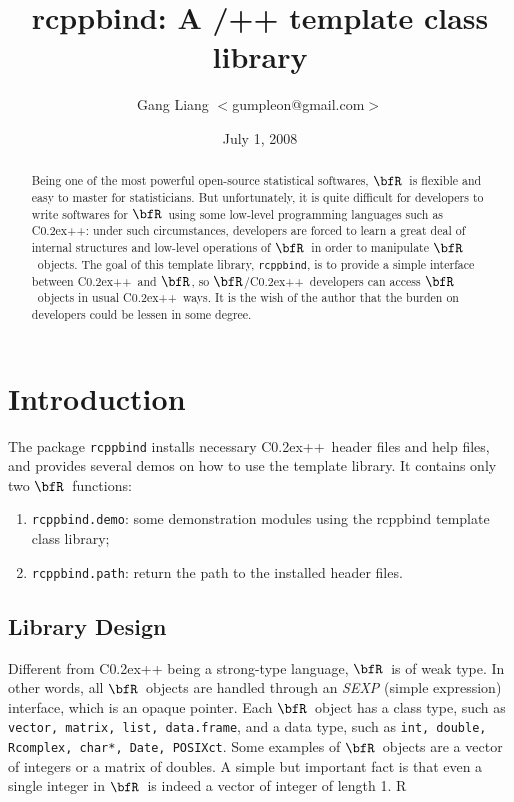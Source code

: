 \documentclass{article}
\title{rcppbind: A \R/\C++ template class library}
\date{July 1, 2008}
\author{Gang Liang $<$gumpleon@gmail.com$>$}
\def\C++{C{\raise 0.2ex\hbox{++}}}
\newcommand{\R}{$\bfR$}
\begin{document}
\maketitle

\begin{abstract}%
  Being one of the most powerful open-source statistical softwares,
  \R\ is flexible and easy to master
  for statisticians. But unfortunately, it is quite difficult for
  developers to write softwares for \R\ using some low-level programming languages
  such as \C++: under such circumstances, developers are
  forced to learn a great deal of internal structures and
  low-level operations of \R\ in order to manipulate \R\ objects.  The
  goal of this template library, \texttt{rcppbind}, is to
  provide a simple interface between \C++\ and \R, so
  \R/\C++\ developers can access \R\ objects in usual \C++\
  ways. It is the wish of the author that the burden on
  developers could be lessen in some degree.%
\end{abstract}

\section{Introduction}

The package \texttt{rcppbind} installs necessary \C++\ header
files and help files, and provides several demos on how to
use the template library. It contains only two \R\ functions:
\begin{enumerate}
  \item \texttt{rcppbind.demo}: some demonstration
    modules using the rcppbind template class library;
  \item \texttt{rcppbind.path}: return the path to the
    installed header files.
\end{enumerate}

\subsection{Library Design}

Different from \C++ being a strong-type language, \R\ is of
weak type. In other words, all \R\ objects are handled
through an \textsl{SEXP} (simple expression) interface, which
is an opaque pointer. Each \R\ object has a class type, such
as \texttt{vector, matrix, list, data.frame}, and a data
type, such as \texttt{int, double, Rcomplex, char*, Date,
POSIXct}. Some examples of \R\ objects are a
vector of integers or a matrix of doubles. A simple but
important fact is that even a single integer in \R\ is indeed
a vector of integer of length 1.  R
\end{document}
